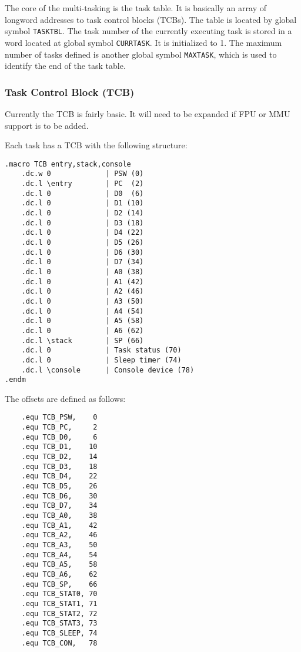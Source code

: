 \documentclass[10pt, openany]{book}
\begin{document}
The core of the multi-tasking is the task table.  It is basically an array of longword addresses to task control blocks (TCBs).  The table is located by global symbol \verb|TASKTBL|.  The task number of the currently executing task is stored in a word located at global symbol \verb|CURRTASK|.  It is initialized to 1.  The maximum number of tasks defined is another global symbol \verb|MAXTASK|, which is used to identify the end of the task table.

\subsubsection{Task Control Block (TCB)}
Currently the TCB is fairly basic.  It will need to be expanded if FPU or MMU support is to be added.

Each task has a TCB with the following structure:
\begin{lstlisting}
.macro TCB entry,stack,console
    .dc.w 0             | PSW (0)
    .dc.l \entry        | PC  (2)
    .dc.l 0             | D0  (6)
    .dc.l 0             | D1 (10)
    .dc.l 0             | D2 (14)
    .dc.l 0             | D3 (18)
    .dc.l 0             | D4 (22)
    .dc.l 0             | D5 (26)
    .dc.l 0             | D6 (30)
    .dc.l 0             | D7 (34)
    .dc.l 0             | A0 (38)
    .dc.l 0             | A1 (42)
    .dc.l 0             | A2 (46)
    .dc.l 0             | A3 (50)
    .dc.l 0             | A4 (54)
    .dc.l 0             | A5 (58)
    .dc.l 0             | A6 (62)
    .dc.l \stack        | SP (66)
    .dc.l 0             | Task status (70)
    .dc.l 0             | Sleep timer (74)
    .dc.l \console      | Console device (78)
.endm
\end{lstlisting}

The offsets are defined as follows:
\begin{lstlisting}
    .equ TCB_PSW,    0
    .equ TCB_PC,     2
    .equ TCB_D0,     6
    .equ TCB_D1,    10
    .equ TCB_D2,    14
    .equ TCB_D3,    18
    .equ TCB_D4,    22
    .equ TCB_D5,    26
    .equ TCB_D6,    30
    .equ TCB_D7,    34
    .equ TCB_A0,    38
    .equ TCB_A1,    42
    .equ TCB_A2,    46
    .equ TCB_A3,    50
    .equ TCB_A4,    54
    .equ TCB_A5,    58
    .equ TCB_A6,    62
    .equ TCB_SP,    66
    .equ TCB_STAT0, 70
    .equ TCB_STAT1, 71
    .equ TCB_STAT2, 72
    .equ TCB_STAT3, 73
    .equ TCB_SLEEP, 74
    .equ TCB_CON,   78
\end{lstlisting}
\end{document}
